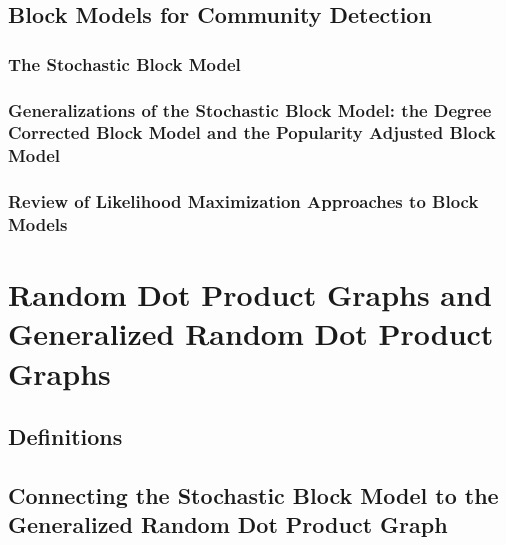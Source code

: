 \documentclass[
  11pt,
]{article}
\begin{document}
\hypertarget{block-models-for-community-detection}{%
\subsection{Block Models for Community
Detection}\label{block-models-for-community-detection}}

\hypertarget{the-stochastic-block-model}{%
\subsubsection{The Stochastic Block
Model}\label{the-stochastic-block-model}}

\hypertarget{generalizations-of-the-stochastic-block-model-the-degree-corrected-block-model-and-the-popularity-adjusted-block-model}{%
\subsubsection{Generalizations of the Stochastic Block Model: the Degree
Corrected Block Model and the Popularity Adjusted Block
Model}\label{generalizations-of-the-stochastic-block-model-the-degree-corrected-block-model-and-the-popularity-adjusted-block-model}}

\hypertarget{review-of-likelihood-maximization-approaches-to-block-models}{%
\subsubsection{Review of Likelihood Maximization Approaches to Block
Models}\label{review-of-likelihood-maximization-approaches-to-block-models}}

\newpage

\hypertarget{random-dot-product-graphs-and-generalized-random-dot-product-graphs}{%
\section{Random Dot Product Graphs and Generalized Random Dot Product
Graphs}\label{random-dot-product-graphs-and-generalized-random-dot-product-graphs}}

\hypertarget{definitions}{%
\subsection{Definitions}\label{definitions}}

\hypertarget{connecting-the-stochastic-block-model-to-the-generalized-random-dot-product-graph}{%
\subsection{Connecting the Stochastic Block Model to the Generalized
Random Dot Product
Graph}\label{connecting-the-stochastic-block-model-to-the-generalized-random-dot-product-graph}}
\end{document}
